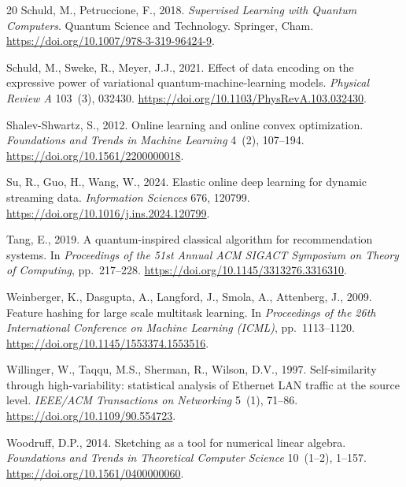 \documentclass[preprint,12pt,authoryear]{elsarticle}
\begin{document}
\begin{thebibliography}{20}
Schuld, M., Petruccione, F., 2018.
\newblock \emph{Supervised Learning with Quantum Computers}.
\newblock Quantum Science and Technology. Springer, Cham.
\newblock \url{https://doi.org/10.1007/978-3-319-96424-9}.

Schuld, M., Sweke, R., Meyer, J.J., 2021.
\newblock Effect of data encoding on the expressive power of variational quantum-machine-learning models.
\newblock \emph{Physical Review A} 103~(3), 032430.
\newblock \url{https://doi.org/10.1103/PhysRevA.103.032430}.

Shalev-Shwartz, S., 2012.
\newblock Online learning and online convex optimization.
\newblock \emph{Foundations and Trends in Machine Learning} 4~(2), 107--194.
\newblock \url{https://doi.org/10.1561/2200000018}.

Su, R., Guo, H., Wang, W., 2024.
\newblock Elastic online deep learning for dynamic streaming data.
\newblock \emph{Information Sciences} 676, 120799.
\newblock \url{https://doi.org/10.1016/j.ins.2024.120799}.

Tang, E., 2019.
\newblock A quantum-inspired classical algorithm for recommendation systems.
\newblock In \emph{Proceedings of the 51st Annual ACM SIGACT Symposium on Theory of Computing}, pp.~217--228.
\newblock \url{https://doi.org/10.1145/3313276.3316310}.

Weinberger, K., Dasgupta, A., Langford, J., Smola, A., Attenberg, J., 2009.
\newblock Feature hashing for large scale multitask learning.
\newblock In \emph{Proceedings of the 26th International Conference on Machine Learning (ICML)}, pp.~1113--1120.
\newblock \url{https://doi.org/10.1145/1553374.1553516}.

Willinger, W., Taqqu, M.S., Sherman, R., Wilson, D.V., 1997.
\newblock Self-similarity through high-variability: statistical analysis of Ethernet LAN traffic at the source level.
\newblock \emph{IEEE/ACM Transactions on Networking} 5~(1), 71--86.
\newblock \url{https://doi.org/10.1109/90.554723}.

Woodruff, D.P., 2014.
\newblock Sketching as a tool for numerical linear algebra.
\newblock \emph{Foundations and Trends in Theoretical Computer Science} 10~(1--2), 1--157.
\newblock \url{https://doi.org/10.1561/0400000060}.


\end{thebibliography}
\end{document}
